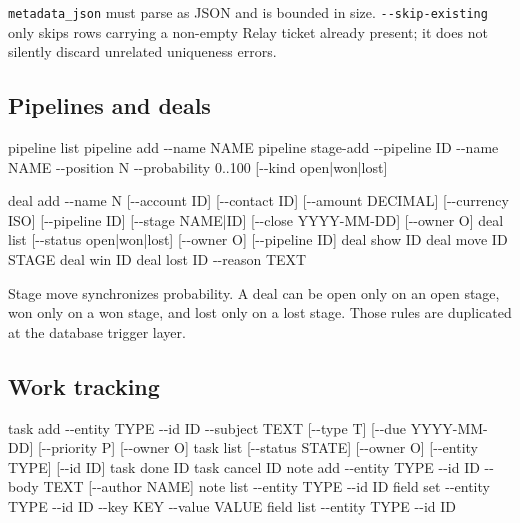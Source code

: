 \documentclass[
]{article}
\newenvironment{Shaded}{}{}
\newcommand{\NormalTok}[1]{#1}
\begin{document}
\texttt{metadata\_json} must parse as JSON and is bounded in size.
\texttt{-\/-skip-existing} only skips rows carrying a non-empty Relay
ticket already present; it does not silently discard unrelated
uniqueness errors.

\subsection{Pipelines and deals}\label{pipelines-and-deals}

\begin{Shaded}
\begin{Highlighting}[]
\NormalTok{pipeline list}
\NormalTok{pipeline add {-}{-}name NAME}
\NormalTok{pipeline stage{-}add {-}{-}pipeline ID {-}{-}name NAME {-}{-}position N {-}{-}probability 0..100 [{-}{-}kind open|won|lost]}

\NormalTok{deal add {-}{-}name N [{-}{-}account ID] [{-}{-}contact ID] [{-}{-}amount DECIMAL] [{-}{-}currency ISO]}
\NormalTok{         [{-}{-}pipeline ID] [{-}{-}stage NAME|ID] [{-}{-}close YYYY{-}MM{-}DD] [{-}{-}owner O]}
\NormalTok{deal list [{-}{-}status open|won|lost] [{-}{-}owner O] [{-}{-}pipeline ID]}
\NormalTok{deal show ID}
\NormalTok{deal move ID STAGE}
\NormalTok{deal win ID}
\NormalTok{deal lost ID {-}{-}reason TEXT}
\end{Highlighting}
\end{Shaded}

Stage move synchronizes probability. A deal can be open only on an open
stage, won only on a won stage, and lost only on a lost stage. Those
rules are duplicated at the database trigger layer.

\subsection{Work tracking}\label{work-tracking}

\begin{Shaded}
\begin{Highlighting}[]
\NormalTok{task add {-}{-}entity TYPE {-}{-}id ID {-}{-}subject TEXT [{-}{-}type T] [{-}{-}due YYYY{-}MM{-}DD]}
\NormalTok{         [{-}{-}priority P] [{-}{-}owner O]}
\NormalTok{task list [{-}{-}status STATE] [{-}{-}owner O] [{-}{-}entity TYPE] [{-}{-}id ID]}
\NormalTok{task done ID}
\NormalTok{task cancel ID}
\NormalTok{note add {-}{-}entity TYPE {-}{-}id ID {-}{-}body TEXT [{-}{-}author NAME]}
\NormalTok{note list {-}{-}entity TYPE {-}{-}id ID}
\NormalTok{field set {-}{-}entity TYPE {-}{-}id ID {-}{-}key KEY {-}{-}value VALUE}
\NormalTok{field list {-}{-}entity TYPE {-}{-}id ID}
\end{Highlighting}
\end{Shaded}
\end{document}
